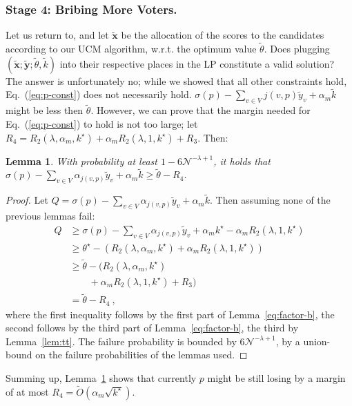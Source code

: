 \documentclass[letterpaper]{article} %
\newtheorem{lemma}[theorem]{Lemma}
\theoremstyle{definition}
\newcommand{\NN}{\mathcal{N}}
\newcommand\vecc{\mathbf}
\begin{document}
\subsubsection{Stage 4: Bribing More Voters.} Let us return to, and let $\vecc{\tilde{x}}$ be the allocation of the scores to the candidates according to our UCM algorithm, w.r.t. the optimum value $\tilde{\theta}$.
Does plugging $(\vecc{\tilde{x}};\vecc{\tilde{y}};\tilde{\theta}, \tilde{k})$ into their respective places in the LP constitute a valid solution? The answer is unfortunately no; while we showed that all other constraints hold, Eq.~(\ref{eq:p-const}) does not necessarily hold.
$\sigma(p) - \sum_{v \in V}j(v,p) \tilde{y}_{v} + \alpha_m \tilde{k}$ might be less then $\tilde{\theta}$.
However, we can prove that the margin needed for Eq.~(\ref{eq:p-const}) to hold is not too large; let $R_4 = R_2(\lambda, \alpha_{m},k^\star)
 +  \alpha_{m}R_2(\lambda, 1,k^\star) + 	R_3$. Then:
\begin{lemma}\label{lem:margin}
	With probability at least $1-6 \NN^{-\lambda + 1}$, it holds that $\sigma(p) - \sum_{v \in V}\alpha_{j(v,p)} \tilde{y}_{v} + \alpha_m\tilde{k} \geq \tilde{\theta}-R_4$.
\end{lemma}
\begin{proof}
	Let $Q=\sigma(p) - \sum_{v \in V}\alpha_{j(v,p)} \tilde{y}_{v} + \alpha_m\tilde{k}$. Then assuming none of the previous lemmas fail:
	\begin{align*}
	Q&\geq \sigma(p) - \sum_{v \in V}\alpha_{j(v,p)} \tilde{y}_{v}+ \alpha_m k^\star- \alpha_{m} R_2(\lambda, 1,k^\star)\\
	&\geq \theta^\star  - (R_2(\lambda, \alpha_{m},k^\star) +  \alpha_{m}R_2(\lambda, 1,k^\star))\\
	&\geq \tilde{\theta}  - (R_2(\lambda, \alpha_{m},k^\star)\\
	&\qquad +  \alpha_{m}R_2(\lambda, 1,k^\star) + 	R_3)\\
	&=\tilde{\theta}  - R_4\ ,
	\end{align*}
	where the first inequality follows by  the first part of Lemma~\ref{eq:factor-b}, the second follows by the third part of Lemma~\ref{eq:factor-b}, the third by Lemma~\ref{lem:tt}. The failure probability is bounded by $6 \NN^{-\lambda + 1}$, by a union-bound on the failure probabilities of the lemmas used.
\end{proof}
Summing up, Lemma~\ref{lem:margin} shows that currently $p$ might be still losing by a margin of  at most $R_4=\widetilde{O}(\alpha_m\sqrt{k^\star})$.
\end{document}
